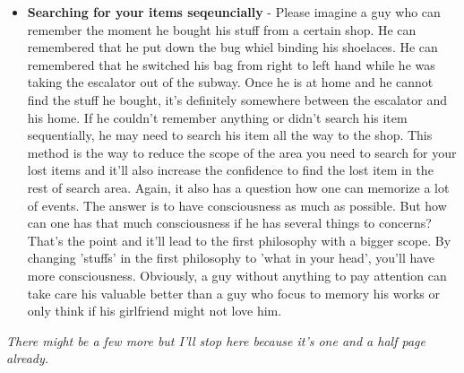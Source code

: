 \begin{itemize}
\item {\bf Searching for your items seqeuncially} - Please imagine a guy who can remember the moment he bought his stuff from a certain shop. He can remembered that he put down the bug whiel binding his shoelaces. He can remembered that he switched his bag from right to left hand while he was taking the escalator out of the subway. Once he is at home and he cannot find the stuff he bought, it's definitely somewhere between the escalator and his home. If he couldn't remember anything or didn't search his item sequentially, he may need to search his item all the way to the shop. This method is the way to reduce the scope of the area you need to search for your lost items and it'll also increase the confidence to find the lost item in the rest of search area. Again, it also has a question how one can memorize a lot of events. The answer is to have consciousness as much as possible. But how can one has that much consciousness if he has several things to concerns? That's the point and it'll lead to the first philosophy with a bigger scope. By changing 'stuffs' in the first philosophy to 'what in your head', you'll have more consciousness. Obviously, a guy without anything to pay attention can take care his valuable better than a guy who focus to memory his works or only think if his girlfriend might not love him.
\end{itemize}

\emph{There might be a few more but I'll stop here because it's one and a half page already.}
